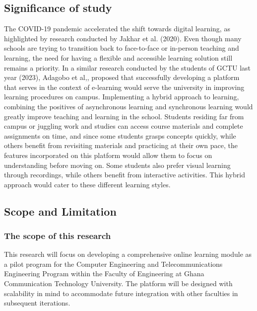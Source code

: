 \documentclass[a4paper,12pt]{article}  %
\begin{document}
\subsection{Significance of study}
The COVID-19 pandemic accelerated the shift towards digital learning, as
highlighted by research conducted by Jakhar et al. (2020). Even though many
schools are trying to transition back to face-to-face or in-person teaching and
learning, the need for having a flexible and accessible learning solution still
remains a priority. In a similar research conducted by the students of GCTU
last year (2023), Adagobo et al,\cite{emmanuel2022design}, proposed that
successfully developing a platform that serves in the context of e-learning
would serve the university in improving learning procedures on campus.
Implementing a hybrid approach to learning, combining the positives of
asynchronous learning and synchronous learning would greatly improve teaching
and learning in the school.\cite{islam2015challenges} Students residing far
from campus or juggling work and studies can access course materials and
complete assignments on time, and since some students grasps concepts quickly,
while others benefit from revisiting materials and practicing at their own
pace, the features incorporated on this platform would allow them to focus on
understanding before moving on. Some students also prefer visual learning
through recordings, while others benefit from interactive activities. This
hybrid approach would cater to these different learning styles.\\

\subsection{Scope and Limitation}
\subsubsection{The scope of this research}
This research will focus on developing a comprehensive online learning module
as a pilot program for the Computer Engineering and Telecommunications
Engineering Program within the Faculty of Engineering at Ghana Communication
Technology University. The platform will be designed with scalability in mind
to accommodate future integration with other faculties in subsequent
iterations.\\
\end{document}
